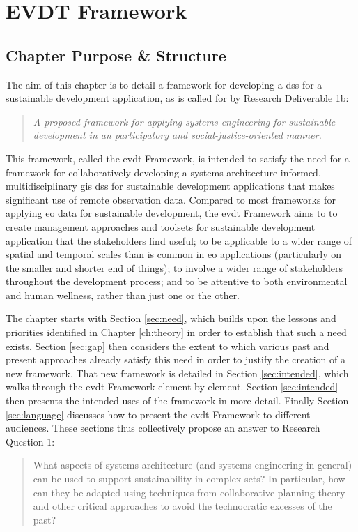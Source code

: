 \chapter{EVDT Framework} \label{ch:evdt}

\section{Chapter Purpose \& Structure}

The aim of this chapter is to detail a framework for developing a \acf{dss} for a sustainable development application, as is called for by Research Deliverable 1b:

\blockquote{\textit{A proposed framework for applying systems engineering for sustainable development in an participatory and social-justice-oriented manner.}} 

This framework, called the \acf{evdt} Framework, is intended to satisfy the need for a framework for collaboratively developing a systems-architecture-informed, multidisciplinary \ac{gis} \ac{dss} for sustainable development applications that makes significant use of remote observation data. Compared to most frameworks for applying \acf{eo} data for sustainable development, the \ac{evdt} Framework aims to to create management approaches and toolsets for sustainable development application that the stakeholders find useful; to be applicable to a wider range of spatial and temporal scales than is common in \ac{eo} applications (particularly on the smaller and shorter end of things); to involve a wider range of stakeholders throughout the development process; and to be attentive to both environmental and human wellness, rather than just one or the other. 

The chapter starts with Section \ref{sec:need}, which builds upon the lessons and priorities identified in Chapter \ref{ch:theory} in order to establish that such a need exists. Section \ref{sec:gap} then considers the extent to which various past and present approaches already satisfy this need in order to justify the creation of a new framework. That new framework is detailed in Section \ref{sec:intended}, which walks through the \ac{evdt} Framework element by element. Section \ref{sec:intended} then presents the intended uses of the framework in more detail. Finally Section \ref{sec:language} discusses how to present the \ac{evdt} Framework to different audiences. These sections thus collectively propose an answer to Research Question 1: 

\blockquote{What aspects of systems architecture (and systems engineering in general) can be used to support sustainability in complex \ac{sets}? In particular, how can they be adapted using techniques from collaborative planning theory and other critical approaches to avoid the technocratic excesses of the past?}

